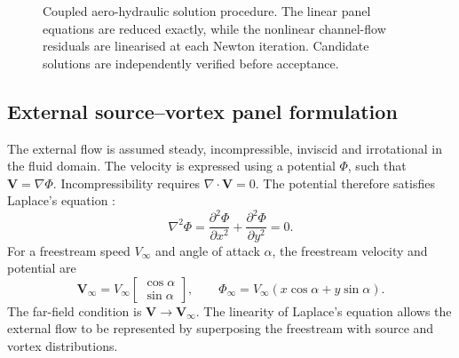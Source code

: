 \documentclass[a4paper,fleqn]{cas-dc}
\begin{document}
\begin{figure}[pos=!htbp]
	
	\caption{Coupled aero-hydraulic solution procedure.
		The linear panel equations are reduced exactly, while
		the nonlinear channel-flow residuals are linearised
		at each Newton iteration. Candidate solutions are
		independently verified before acceptance.}
	\label{fig:coupled_methodology}
\end{figure}

\subsection{External source--vortex panel formulation}
\label{subsec:external_panel}

The external flow is assumed steady, incompressible, inviscid and irrotational in the fluid domain.
The velocity is expressed using a potential $\Phi$, such that $\mathbf{V}=\nabla\Phi$.
Incompressibility requires $\nabla\cdot\mathbf{V}=0$.
The potential therefore satisfies Laplace's equation
\cite{KatzPlotkin2001LowSpeedAerodynamics}:
\begin{equation}
	\nabla^{2}\Phi
	=
	\frac{\partial^{2}\Phi}{\partial x^{2}}
	+
	\frac{\partial^{2}\Phi}{\partial y^{2}}
	=0.
	\label{eq:laplace_equation}
\end{equation}
For a freestream speed $V_{\infty}$ and angle of attack $\alpha$, the freestream velocity and potential are
\begin{equation}
	\mathbf{V}_{\infty}
	=
	V_{\infty}
	\begin{bmatrix}
		\cos\alpha\\
		\sin\alpha
	\end{bmatrix},
	\qquad
	\Phi_{\infty}
	=
	V_{\infty}(x\cos\alpha+y\sin\alpha).
	\label{eq:freestream_velocity}
\end{equation}
The far-field condition is $\mathbf{V}\rightarrow\mathbf{V}_{\infty}$.
The linearity of Laplace's equation allows the external flow to be represented by superposing the freestream with source and vortex distributions.
\end{document}
